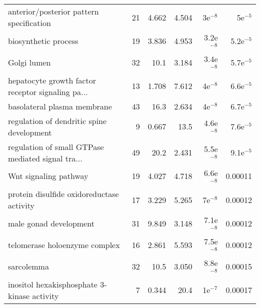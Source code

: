 \begin{longtable}{lrrrrr}
          anterior/posterior pattern specification &                      21 &                   4.662 &      4.504 &            3e$^{-8}$ &            5e$^{-5}$ \\
                              biosynthetic process &                      19 &                   3.836 &      4.953 &          3.2e$^{-8}$ &          5.2e$^{-5}$ \\
                                       Golgi lumen &                      32 &                    10.1 &      3.184 &          3.4e$^{-8}$ &          5.7e$^{-5}$ \\
 hepatocyte growth factor receptor signaling pa... &                      13 &                   1.708 &      7.612 &            4e$^{-8}$ &          6.6e$^{-5}$ \\
                       basolateral plasma membrane &                      43 &                    16.3 &      2.634 &            4e$^{-8}$ &          6.7e$^{-5}$ \\
         regulation of dendritic spine development &                       9 &                   0.667 &       13.5 &          4.6e$^{-8}$ &          7.6e$^{-5}$ \\
 regulation of small GTPase mediated signal tra... &                      49 &                    20.2 &      2.431 &          5.5e$^{-8}$ &          9.1e$^{-5}$ \\
                             Wnt signaling pathway &                      19 &                   4.027 &      4.718 &          6.6e$^{-8}$ &              0.00011 \\
         protein disulfide oxidoreductase activity &                      17 &                   3.229 &      5.265 &            7e$^{-8}$ &              0.00012 \\
                            male gonad development &                      31 &                   9.849 &      3.148 &          7.1e$^{-8}$ &              0.00012 \\
                     telomerase holoenzyme complex &                      16 &                   2.861 &      5.593 &          7.5e$^{-8}$ &              0.00012 \\
                                        sarcolemma &                      32 &                    10.5 &      3.050 &          8.8e$^{-8}$ &              0.00015 \\
       inositol hexakisphosphate 3-kinase activity &                       7 &                   0.344 &       20.4 &            1e$^{-7}$ &              0.00017 \\

\end{longtable}
